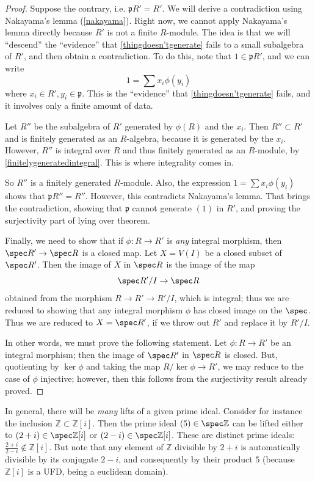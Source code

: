 \begin{proof}
Suppose the
contrary, i.e. $\mathfrak{p}R' = R'$. We will derive a contradiction using
Nakayama's lemma (\cref{nakayama}). 
Right now, we cannot apply Nakayama's lemma directly because $R'$ is not a
finite $R$-module. The idea is that we will ``descend'' the ``evidence'' that 
\eqref{thingdoesn'tgenerate} fails to a small subalgebra of $R'$, and then
obtain a contradiction.
To do this, note that $1 \in \mathfrak{p}R'$, and we can write
\[ 1 = \sum x_i \phi(y_i)  \]
where $x_i \in R', y_i \in \mathfrak{p}$.
This is the ``evidence'' that \eqref{thingdoesn'tgenerate} fails, and it
involves only a finite amount of data. 

Let $R''$ be the subalgebra of $R'$ generated by $\phi(R)$ and the $x_i$. Then
$R'' \subset R'$ and is finitely generated as an $R$-algebra, because it is generated by
the $x_i$. However, $R''$ is integral over $R$ and thus finitely generated as an
$R$-module, by \cref{finitelygeneratedintegral}. This
is where integrality comes in.

So $R''$ is a finitely generated $R$-module. Also, the expression
$1 = \sum x_i \phi(y_i)$ shows that $\mathfrak{p}R'' = R''$. However, this
contradicts Nakayama's lemma. That brings the contradiction, showing that
$\mathfrak{p}$ cannot generate $(1)$ in $R'$, and proving the surjectivity
part of  lying over theorem.

Finally, we need to show that if $\phi: R \to R'$ is \emph{any} integral
morphism, then $\spec R' \to \spec R$ is a closed map. Let $X = V(I) $ be a
closed subset of $\spec R'$. Then the image of $X$ in $\spec R$ is the image
of the map
\[ \spec R'/I \to \spec R   \]
obtained from the morphism $R \to R' \to  R'/I$, which is integral; thus we are
reduced to showing that any integral morphism $\phi$ has closed image on the
$\spec$. 
Thus we are reduced to $X = \spec R'$, if we throw out $R'$ and replace it by
$R'/I$.

In other words, we must prove the following statement. Let $\phi: R \to R'$ be
an integral morphism; then the image of $\spec R'$ in $\spec R$ is closed.
But, quotienting by $\ker \phi$ and taking the map $R/\ker \phi \to R'$, we
may reduce to the case of $\phi$ injective; however, then this follows from
the surjectivity result already proved.
\end{proof}

In general, there will be \emph{many} lifts of a given prime ideal.
Consider for instance the inclusion $\mathbb{Z} \subset \mathbb{Z}[i]$.
Then the prime ideal $(5) \in \spec \mathbb{Z}$ can be lifted either to $(2+i)
\in \spec \mathbb{Z}[i]$
or $(2-i) \in \spec \mathbb{Z}[i]$.
These are distinct prime ideals: $\frac{2+i}{2-i} \notin \mathbb{Z}[i]$. But
note that any element of $\mathbb{Z}$ divisible by $2+i$ is automatically
divisible by its conjugate $2-i$, and consequently by their product $5$
(because $\mathbb{Z}[i]$ is  a UFD, being a euclidean domain).

